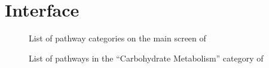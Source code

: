 \section{Interface}
\label{sect:kegg_interface}

\begin{figure}
    \caption{\label{fig:kegg_screenshot_list} List of pathway categories on
    the main screen of \keggapp}
\end{figure}

\begin{figure}
    \caption{\label{fig:kegg_screenshot_sublist} List of pathways in the
    ``Carbohydrate Metabolism'' category of \keggapp}
\end{figure}

